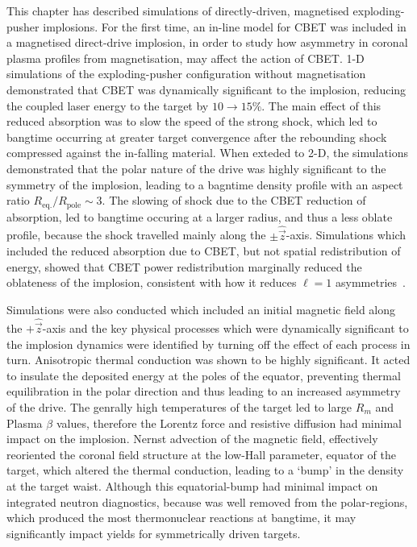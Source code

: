 This chapter has described simulations of directly-driven, magnetised exploding-pusher implosions.
For the first time, an in-line model for \ac{CBET} was included in a magnetised direct-drive implosion, in order to study how asymmetry in coronal plasma profiles from magnetisation, may affect the action of \ac{CBET}.
1-D simulations of the exploding-pusher configuration without magnetisation demonstrated that \ac{CBET} was dynamically significant to the implosion, reducing the coupled laser energy to the target by $10\rightarrow15\%$.
The main effect of this reduced absorption was to slow the speed of the strong shock, which led to bangtime occurring at greater target convergence after the rebounding shock compressed against the in-falling material.
When exteded to 2-D, the simulations demonstrated that the polar nature of the drive was highly significant to the symmetry of the implosion, leading to a bagntime density profile with an aspect ratio $R_{\text{eq.}}/R_{\text{pole}}\sim 3$.
The slowing of shock due to the \ac{CBET} reduction of absorption, led to bangtime occuring at a larger radius, and thus a less oblate profile, because the shock travelled mainly along the $\pm\hat{\vec{z}}$-axis.
Simulations which included the reduced absorption due to \ac{CBET}, but not spatial redistribution of energy, showed that \ac{CBET} power redistribution marginally reduced the oblateness of the implosion, consistent with how it reduces $\ell=1$ asymmetries~\cite{anderson_effect_2020}.

Simulations were also conducted which included an initial magnetic field along the $+\hat{\vec{z}}$-axis and the key physical processes which were dynamically significant to the implosion dynamics were identified by turning off the effect of each process in turn.
Anisotropic thermal conduction was shown to be highly significant.
It acted to insulate the deposited energy at the poles of the equator, preventing thermal equilibration in the polar direction and thus leading to an increased asymmetry of the drive.
The genrally high temperatures of the target led to large $R_m$ and Plasma $\beta$ values, therefore the Lorentz force and resistive diffusion had minimal impact on the implosion.
Nernst advection of the magnetic field, effectively reoriented the coronal field structure at the low-Hall parameter, equator of the target, which altered the thermal conduction, leading to a `bump' in the density at the target waist.
Although this equatorial-bump had minimal impact on integrated neutron diagnostics, because was well removed from the polar-regions, which produced the most thermonuclear reactions at bangtime, it may significantly impact yields for symmetrically driven targets.

